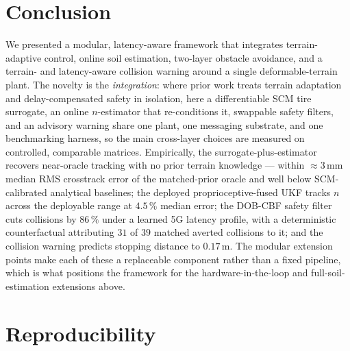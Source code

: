 \documentclass[conference,letterpaper,10pt]{IEEEtran}
\begin{document}
\section{Conclusion}
\label{sec:conclusion}
We presented a modular, latency-aware framework that integrates
terrain-adaptive control, online soil estimation, two-layer obstacle
avoidance, and a terrain- and latency-aware collision warning around a
single deformable-terrain plant. The novelty is the \emph{integration}:
where prior work treats terrain adaptation and delay-compensated safety
in isolation, here a differentiable SCM tire surrogate, an online
$n$-estimator that re-conditions it, swappable safety filters, and an
advisory warning share one plant, one messaging substrate, and one
benchmarking harness, so the main cross-layer choices are measured on
controlled, comparable matrices. Empirically, the surrogate-plus-estimator recovers
near-oracle tracking with no prior terrain knowledge --- within
$\approx\!3\,\mathrm{mm}$ median RMS crosstrack error of the
matched-prior oracle and well below SCM-calibrated analytical baselines;
the deployed proprioceptive-fused UKF tracks $n$ across the deployable
range at $4.5\,\%$ median error; the DOB-CBF safety filter cuts collisions
by $86\,\%$ under a learned 5G latency profile, with a deterministic
counterfactual attributing $31$ of $39$ matched averted collisions to it;
and the collision warning predicts stopping distance to $0.17\,\mathrm{m}$. The modular
extension points make each of these a replaceable component rather than a
fixed pipeline, which is what positions the framework for the
hardware-in-the-loop and full-soil-estimation extensions above.

\section*{Reproducibility}
\end{document}
